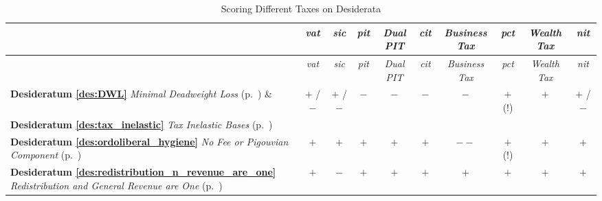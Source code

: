 


\begin{landscape}
\begin{longtabu}{p{4cm}ccccccccc}
\caption[Scoring Different Taxes on Desiderata]{Scoring Different Taxes on Desiderata\label{tab:tax-scores}}\\
\toprule
&\emph{vat}	&\emph{sic}	&\emph{pit}		&\emph{Dual PIT}	&\emph{cit}	&\emph{Business Tax}	&\emph{pct}	&\emph{Wealth Tax} 	&\emph{nit}\vspace{15pt} \\
\midrule
\endfirsthead

\toprule
 &\emph{vat}	&\emph{sic}	&\emph{pit}		&\emph{Dual PIT}	&\emph{cit}	&\emph{Business Tax}	&\emph{pct}	&\emph{Wealth Tax} 	&\emph{nit}\vspace{15pt} \\ \midrule \endhead

\textbf{Desideratum \ref{des:DWL}} \emph{Minimal Deadweight Loss} (p.~\pageref{des:DWL}) \&
&$+$ / $-$		&$+$ /$-$		&$-$				&$-$			&$-$			&$-$				&$+$ (!)		&$+$				&$+$ / $-$\\
\textbf{Desideratum \ref{des:tax_inelastic}} \emph{Tax Inelastic Bases} (p.~\pageref{des:tax_inelastic}) \vspace{10pt}
&			&			&				&			&			&				&			&				&\\
\textbf{Desideratum \ref{des:ordoliberal_hygiene}} \emph{No Fee or Pigouvian Component} (p.~\pageref{des:ordoliberal_hygiene}) \vspace{10pt}
&$+$ 			&$+$			&$+$				&$+$			&$+$			&$--$				&$+$ (!)		&$+$				&$+$\\%

\textbf{Desideratum \ref{des:redistribution_n_revenue_are_one}} \emph{Redistribution and General Revenue are One} (p.~\pageref{des:redistribution_n_revenue_are_one}) \vspace{10pt}
&$+$ 			&$-$			&$+$				&$+$			&$+$			&$+$				&$+$			&$+$				&$+$\\%


\end{longtabu}
\end{landscape}
